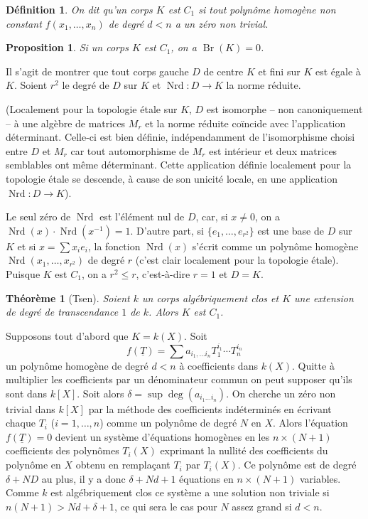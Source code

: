 \documentclass{article}
\DeclareMathOperator{\br}{Br}
\DeclareMathOperator{\nrd}{Nrd}
\newtheorem{proposition}[subsubsection]{Proposition}
\newtheorem{definition}[subsubsection]{Définition}
\newtheorem{theorem}[subsubsection]{Théorème}
\begin{document}
\begin{definition}\label{3-2-1}
On dit qu'un corps $K$ est $C_1$ si tout polynôme homogène non constant 
$f(x_1,\dotsc,x_n)$ de degré $d<n$ a un zéro non trivial.
\end{definition}





\begin{proposition}\label{3-2-2}
Si un corps $K$ est $C_1$, on a $\br(K)=0$.
\end{proposition}

Il s'agit de montrer que tout corps gauche $D$ de centre $K$ et fini sur $K$ 
est égale à $K$. Soient $r^2$ le degré de $D$ sur $K$ et $\nrd:D\to K$ la 
norme réduite. 

(Localement pour la topologie étale sur $K$, $D$ est isomorphe -- non 
canoniquement -- à une algèbre de matrices $M_r$ et la norme réduite 
coïncide avec l'application déterminant. Celle-ci est bien définie, 
indépendamment de l'isomorphisme choisi entre $D$ et $M_r$ car tout 
automorphisme de $M_r$ est intérieur et deux matrices semblables ont 
m\^eme déterminant. Cette application définie localement pour la 
topologie étale se descende, à cause de son unicité locale, en une 
application $\nrd:D\to K$). 

Le seul zéro de $\nrd$ est l'élément nul de $D$, car, si $x\ne 0$, on a 
$\nrd(x)\cdot \nrd(x^{-1}) = 1$. D'autre part, si $\{e_1,\dotsc,e_{r^2}\}$ est 
une base de $D$ sur $K$ et si $x=\sum x_i e_i$, la fonction $\nrd(x)$ s'écrit 
comme un polynôme homogène $\nrd(x_1,\dotsc,x_{r^2})$ de degré $r$ (c'est 
clair localement pour la topologie étale). Puisque $K$ est $C_1$, on a 
$r^2\leqslant r$, c'est-à-dire $r=1$ et $D=K$. 





\begin{theorem}[Tsen]\label{3-2-3}
Soient $k$ un corps algébriquement clos et $K$ une extension de degré de 
transcendance $1$ de $k$. Alors $K$ est $C_1$.
\end{theorem}

Supposons tout d'abord que $K=k(X)$. Soit 
\[
  f(\underline T) = \sum a_{i_1,\dotsc i_n} T_1^{i_1} \dotsm T_n^{i_n}
\]
un polynôme homogène de degré $d<n$ à coefficients dans $k(X)$. Quitte 
à multiplier les coefficients par un dénominateur commun on peut supposer 
qu'ils sont dans $k[X]$. Soit alors $\delta=\sup\deg(a_{i_1\dotsc i_n})$. On 
cherche un zéro non trivial dans $k[X]$ par la méthode des coefficients 
indéterminés en écrivant chaque $T_i$ ($i=1,\dotsc,n$) comme un 
polynôme de degré $N$ en $X$. Alors l'équation 
$f(\underline T)=0$ devient un système d'équations homogènes en les 
$n\times (N+1)$ coefficients des polynômes $T_i(X)$ exprimant la nullité 
des coefficients du polynôme en $X$ obtenu en remplaçant $T_i$ par 
$T_i(X)$. Ce polynôme est de degré $\delta+N D$ au plus, il y a donc 
$\delta+N d+1$ équations en $n\times (N+1)$ variables. Comme $k$ est 
algébriquement clos ce système a une solution non triviale si 
$n(N+1)>N d+\delta+1$, ce qui sera le cas pour $N$ assez grand si $d<n$. 
\end{document}
